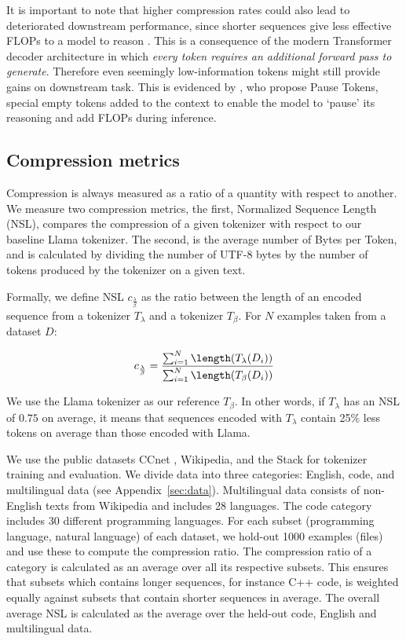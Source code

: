 It is important to note that higher compression rates could also lead to deteriorated downstream performance, since shorter sequences give less effective FLOPs to a model to reason \cite{pause_tokens}. This is a consequence of the modern Transformer decoder architecture in which \textit{every token requires an additional forward pass to generate}. Therefore even seemingly low-information tokens might still provide gains on downstream task. This is evidenced by \citet{pause_tokens}, who propose Pause Tokens, special empty tokens added to the context to enable the model to `pause' its reasoning and add FLOPs during inference. 

\subsection{Compression metrics}
\label{sec:metrics}

Compression is always measured as a ratio of a quantity with respect to another. We measure two compression metrics, the first, Normalized Sequence Length (NSL), compares the compression of a given tokenizer with respect to our baseline Llama tokenizer. The second, is the average number of Bytes per Token, and is calculated by dividing the number of UTF-8 bytes by the number of tokens produced by the tokenizer on a given text.

Formally, we define NSL $c_{\frac{\lambda}{\beta}}$ as the ratio between the length of an encoded sequence from a tokenizer $T_\lambda$ and a tokenizer $T_\beta$. For $N$ examples taken from a dataset $D$:

$$
    c_{\frac{\lambda}{\beta}} = \frac{\sum_{i=1}^N \length(T_\lambda(D_i))}{\sum_{i=1}^N \length(T_\beta(D_i))}
$$

We use the Llama tokenizer \cite{touvron2023llama} as our reference $T_\beta$.
In other words, if $T_\lambda$ has an NSL of $0.75$ on average, it means that sequences encoded with $T_\lambda$ contain 25\% less tokens on average than those encoded with Llama.

We use the public datasets CCnet \cite{ccnet}, Wikipedia, and the Stack \cite{Kocetkov2022TheS3} for tokenizer training and evaluation. We divide data into three categories: English, code, and multilingual data (see Appendix~\ref{sec:data}).
Multilingual data consists of non-English texts from Wikipedia and includes 28 languages. The code category includes 30 different programming languages. For each subset (programming language, natural language) of each dataset, we hold-out 1000 examples (files) and use these to compute the compression ratio. The compression ratio of a category is calculated as an average over all its respective subsets. This ensures that subsets which contains longer sequences, for instance C++ code, is weighted equally against subsets that contain shorter sequences in average. The overall average NSL is calculated as the average over the held-out code, English and multilingual data.

